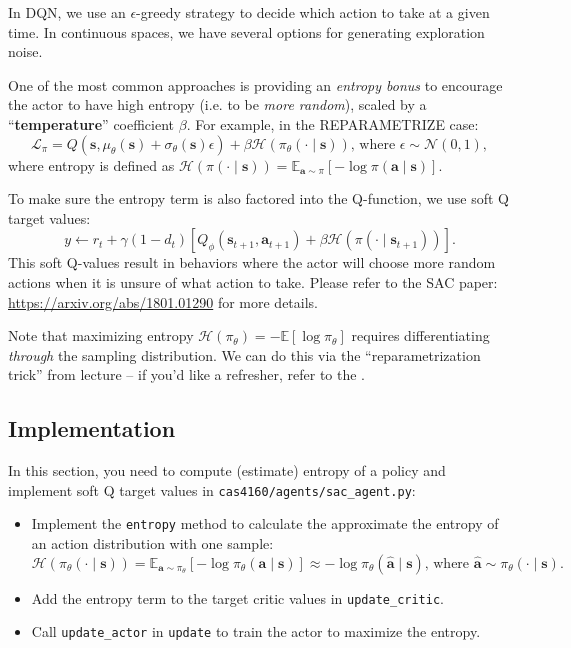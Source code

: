 \documentclass{article}
\def\rva{{\mathbf{a}}}
\def\rvs{{\mathbf{s}}}
\begin{document}
In DQN, we use an $\epsilon$-greedy strategy to decide which action to take at a given time. In continuous spaces, we have several options for generating exploration noise.

One of the most common approaches is providing an \textit{entropy bonus} to encourage the actor to have high entropy (i.e. to be \textit{more random}), scaled by a ``\textbf{temperature}'' coefficient $\beta$. For example, in the REPARAMETRIZE case:
\begin{equation}
    \mathcal L_\pi = Q(\rvs, \mu_\theta(\rvs) + \sigma_\theta(\rvs)\epsilon) + \beta\mathcal{H}(\pi_\theta(\cdot \mid \rvs))\text{, where } \epsilon \sim \mathcal{N}(0, 1),
\end{equation}
where entropy is defined as $\mathcal H(\pi(\cdot \mid \rvs)) = \mathbb{E}_{\rva \sim \pi}\left[-\log\pi(\rva \mid \rvs)\right]$.

To make sure the entropy term is also factored into the Q-function, we use soft Q target values:
\begin{equation}
    y \gets r_t + \gamma(1-d_t)\left[Q_\phi(\rvs_{t+1}, \rva_{t+1}) + \beta\mathcal{H}(\pi(\cdot \mid \rvs_{t+1}))\right].
\end{equation}
This soft Q-values result in behaviors where the actor will choose more random actions when it is unsure of what action to take.
Please refer to the SAC paper: {\url{https://arxiv.org/abs/1801.01290}} for more details.

Note that maximizing entropy $\mathcal{H}(\pi_\theta) = -\mathbb{E}[\log \pi_\theta]$ requires differentiating \textit{through} the sampling distribution. We can do this via the ``reparametrization trick'' from lecture -- if you'd like a refresher, refer to the .


\subsection{Implementation}
In this section, you need to compute (estimate) entropy of a policy and implement soft Q target values in \verb|cas4160/agents/sac_agent.py|:
\begin{itemize}
    \item Implement the \verb|entropy| method to calculate the approximate the entropy of an action distribution with one sample:
    \begin{equation}
        \mathcal{H}(\pi_\theta(\cdot \mid \rvs)) = \mathbb{E}_{\rva \sim \pi_\theta}\left[ -\log\pi_\theta(\rva \mid \rvs) \right] \approx -\log\pi_\theta(\hat{\rva} \mid \rvs)\text{, where } \hat{\rva} \sim \pi_\theta(\cdot \mid \rvs).
    \end{equation}
    \item Add the entropy term to the target critic values in \verb|update_critic|. %
    \item Call \verb|update_actor| in \verb|update| to train the actor to maximize the entropy.
\end{itemize}
\end{document}
